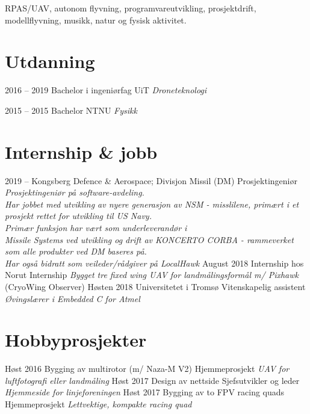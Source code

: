 \documentclass[]{friggeri-cv}
\begin{document}
RPAS/UAV, autonom flyvning, programvareutvikling, prosjektdrift,\\ modellflyvning, musikk, natur og fysisk aktivitet.

\section{Utdanning}

\begin{entrylist}
  \entry
    {2016 -- 2019}
    {Bachelor i ingeniørfag}
    {UiT}
    {\emph{Droneteknologi}}
    
  \entry
    {2015 -- 2015}
    {Bachelor}
    {NTNU}
    {\emph{Fysikk}}
\end{entrylist}


\section{Internship \& jobb}
\begin{entrylist}
	\entry
	{2019 -- \the\year}
	{Kongsberg Defence \& Aerospace; Divisjon Missil (DM)}
	{Prosjektingeniør}
	{\emph{Prosjektingeniør på software-avdeling.\\ Har jobbet med utvikling av nyere generasjon av NSM - misslilene, primært i et prosjekt rettet for utvikling til US Navy. \\
	Primær funksjon har vært som underleverandør i \\ 
	Missile Systems ved utvikling og drift av KONCERTO CORBA - rammeverket som alle produkter ved DM baseres på. \\
	Har også bidratt som veileder/rådgiver på LocalHawk}}
    \entry
    {August 2018}
    {Internship hos Norut}
    {Internship}
    {\emph{Bygget tre fixed wing UAV for landmålingsformål m/ Pixhawk}\\(CryoWing Observer)}
	\entry
   {Høsten 2018}
   {Universitetet i Tromsø}
   {Vitenskapelig assistent}
   {\emph{Øvingslærer i Embedded C for Atmel}}    
    
\end{entrylist}

\section{Hobbyprosjekter}
\begin{entrylist}

  \entry
    {Høst 2016}
    {Bygging av multirotor (m/ Naza-M V2)}
    {Hjemmeprosjekt}
    {\emph{UAV for luftfotografi eller landmåling}}
  \entry
    {Høst 2017}
    {Design av nettside}
    {Sjefsutvikler og leder}
    {\emph{Hjemmeside for linjeforeningen}}
  \entry
  {Høst 2017}
  {Bygging av to FPV racing quads}
  {Hjemmeprosjekt}
  {\emph{Lettvektige, kompakte racing quad}}
\end{entrylist}
\end{document}
